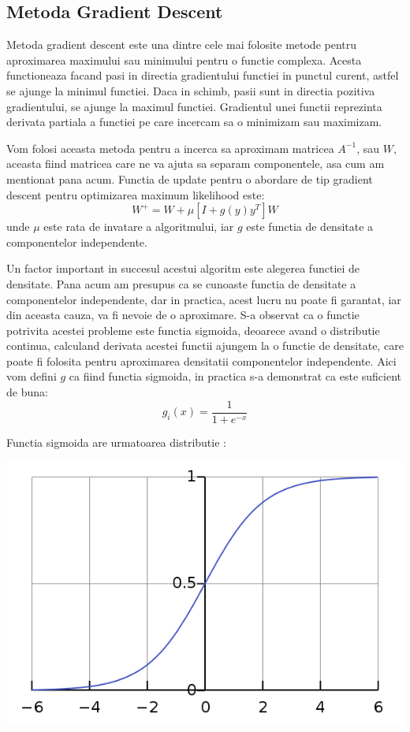 \documentclass[12pt,oneside]{article}
\begin{document}
\subsection{Metoda Gradient Descent}
Metoda gradient descent este una dintre cele mai folosite metode pentru aproximarea maximului sau minimului pentru o functie complexa. Acesta functioneaza facand pasi in directia gradientului functiei in punctul curent, astfel se ajunge la minimul functiei. Daca in schimb, pasii sunt in directia pozitiva gradientului, se ajunge la maximul functiei. Gradientul unei functii reprezinta derivata partiala a functiei pe care incercam sa o minimizam sau maximizam.\cite{gradiend_descent_wiki}

Vom folosi aceasta metoda pentru a incerca sa aproximam matricea $A^{-1}$, sau $W$, aceasta fiind matricea care ne va ajuta sa separam componentele, asa cum am mentionat pana acum. Functia de update pentru o abordare de tip gradient descent pentru optimizarea maximum likelihood este:
\begin{equation}
	W^+=W+ \mu [I + g(y) y^T]W
\end{equation}
unde $\mu$ este rata de invatare a algoritmului, iar $g$ este functia de densitate a componentelor independente.\cite{hyvarien}

Un factor important in succesul acestui algoritm este alegerea functiei de densitate. Pana acum am presupus ca se cunoaste functia de densitate a componentelor independente, dar in practica, acest lucru nu poate fi garantat, iar din aceasta cauza, va fi nevoie de o aproximare. S-a observat ca o functie potrivita acestei probleme este functia sigmoida, deoarece avand o distributie continua, calculand derivata acestei functii ajungem la o functie de densitate, care poate fi folosita pentru aproximarea densitatii componentelor independente. Aici vom defini $g$ ca fiind functia sigmoida, in practica s-a demonstrat ca este suficient de buna:
\begin{equation}
	g_i(x)=\frac{1}{1+e^{-x}}
\end{equation}

Functia sigmoida are urmatoarea distributie \cite{sigmoid_function_wiki}:
\begin{center}
	\includegraphics[scale=0.6]{sigmoid_function}
 \end{center}
\end{document}
